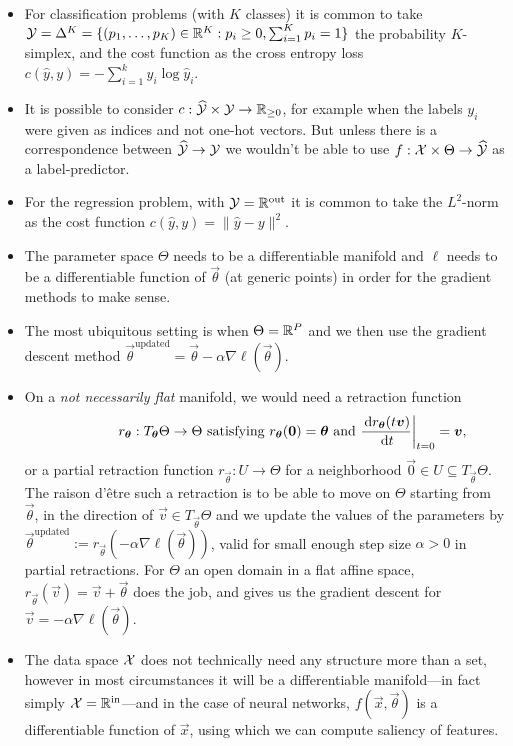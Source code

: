 \documentclass[12pt]{amsart}
\begin{document}
\begin{itemize}
\item For classification problems (with $K$ classes) it is common to take $\mathcal{Y} =  \Delta^K = \{(p_1, \ldots, p_K) \in \mathbb{R}^K : p_i \geq 0, \sum_{i = 1}^K p_i = 1\}$ the probability $K$-simplex, and the cost function as the cross entropy loss $c(\hat y, y) = - \sum_{i = 1}^k y_i \log \hat y_i$.
\item It is possible to consider $c : \widehat{\mathcal{Y}} \times \mathcal{Y} \to \mathbb{R}_{\geq 0}$, for example when the labels $y_i$ were given as indices and not one-hot vectors. But unless there is a correspondence between $\widehat{\mathcal{Y}} \rightarrow  \mathcal{Y}$ we wouldn't be able to use $f: \mathcal{X} \times \Theta \to \widehat{\mathcal{Y}}$ as a label-predictor.
\item For the regression problem, with $\mathcal{Y} = \mathbb{R}^{\text{out}}$ it is common to take the $L^2$-norm as the cost function $c(\hat y, y) = \|\hat y - y\|^2$.
\item The parameter space $\Theta$ needs to be a differentiable manifold and $\ell$ needs to be a differentiable function of $\vec{\theta}$ (at generic points) in order for the gradient methods to make sense. 
\item The most ubiquitous setting is when $\Theta = \mathbb{R}^P$ and we then use the gradient descent method  $\vec{\theta}^{\text{updated}} = \vec{\theta} - \alpha \nabla \ell(\vec \theta)$. 
\item On a \emph{not necessarily flat} manifold, we would need a retraction function
\[
	\qquad \qquad r_{\mathbf{\boldsymbol{\theta}}} : T_{\mathbf{\boldsymbol{\theta}}} \Theta \to \Theta  \text{ satisfying } r_{\mathbf{\boldsymbol{\theta}}}(\mathbf{\boldsymbol{0}}) = \mathbf{\boldsymbol{\theta}} \text{ and } \frac{\,\mathrm{d} r_{\mathbf{\boldsymbol{\theta}}}(t \mathbf{\boldsymbol{v}})} {\,\mathrm{d} t}\bigg|_{t = 0} = \mathbf{\boldsymbol{v}},
\]
or a partial retraction function $r_{\vec{\theta}}: U \to \Theta$ for a neighborhood $\vec{0} \in U \subseteq T_{\vec{\theta}}\Theta$. The raison d'\^{e}tre such a retraction is to be able to move on $\Theta$ starting from $\vec{\theta}$, in the direction of $\vec{v}\in T_\vec{\theta} \Theta$ and we update the values of the parameters by $\vec\theta^{\text{updated}} := r_\vec{\theta}(- \alpha \nabla \ell(\vec{\theta}))$, valid for small enough step size $\alpha>0$ in partial retractions. For $\Theta$ an open domain in a flat affine space, $r_{\vec{\theta}} (\vec{v}) = \vec{v} + \vec{\theta}$ does the job, and gives us the gradient descent for $\vec{v} = -\alpha \nabla\ell(\vec{\theta})$.
\item The data space $\mathcal{X}$ does not technically need any structure more than a set, however in most circumstances it will be a differentiable manifold---in fact simply $\mathcal{X} = \mathbb{R}^{\text{in}}$---and in the case of neural networks, $f(\vec{x}, \vec{\theta})$ is a differentiable function of $\vec{x}$, using which we can compute saliency of features.

\end{itemize}
\end{document}
